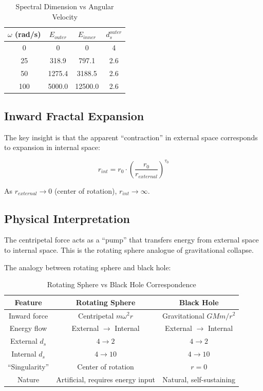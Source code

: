 \begin{table}[htbp]
\centering
\caption{Spectral Dimension vs Angular Velocity}
\begin{tabular}{@{}cccc@{}}
\toprule
$\omega$ (rad/s) & $E_{outer}$ & $E_{inner}$ & $d_s^{outer}$ \\
\midrule
0 & 0 & 0 & 4 \\
25 & 318.9 & 797.1 & 2.6 \\
50 & 1275.4 & 3188.5 & 2.6 \\
100 & 5000.0 & 12500.0 & 2.6 \\
\bottomrule
\end{tabular}
\label{tab:sphere_spectral}
\end{table}

\subsection{Inward Fractal Expansion}

The key insight is that the apparent ``contraction'' in external space corresponds to expansion in internal space:

\begin{equation}
    r_{int} = r_0 \cdot \left(\frac{r_0}{r_{external}}\right)^{\tau_0}
    \label{eq:sphere_internal}
\end{equation}

As $r_{external} \to 0$ (center of rotation), $r_{int} \to \infty$.

\subsection{Physical Interpretation}

\begin{axiom}
The centripetal force acts as a ``pump'' that transfers energy from external space to internal space. This is the rotating sphere analogue of gravitational collapse.
\end{axiom}

The analogy between rotating sphere and black hole:

\begin{table}[htbp]
\centering
\caption{Rotating Sphere vs Black Hole Correspondence}
\begin{tabular}{@{}ccc@{}}
\toprule
Feature & Rotating Sphere & Black Hole \\
\midrule
Inward force & Centripetal $m\omega^2 r$ & Gravitational $GMm/r^2$ \\
Energy flow & External $\to$ Internal & External $\to$ Internal \\
External $d_s$ & $4 \to 2$ & $4 \to 2$ \\
Internal $d_s$ & $4 \to 10$ & $4 \to 10$ \\
``Singularity'' & Center of rotation & $r = 0$ \\
Nature & Artificial, requires energy input & Natural, self-sustaining \\
\bottomrule
\end{tabular}
\label{tab:sphere_bh_full}
\end{table}

